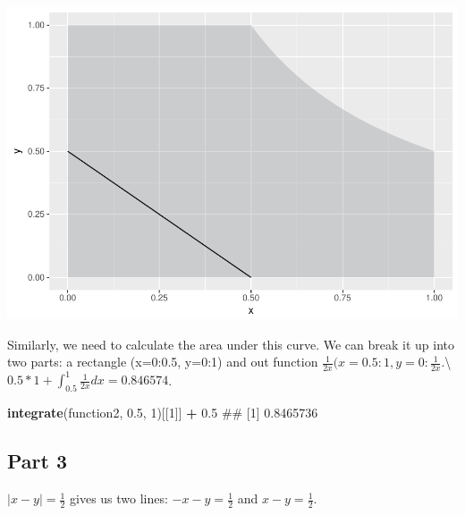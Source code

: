 \documentclass[]{article}
\newenvironment{Shaded}{\begin{snugshade}}{\end{snugshade}}
\newcommand{\KeywordTok}[1]{\textcolor[rgb]{0.13,0.29,0.53}{\textbf{#1}}}
\newcommand{\DecValTok}[1]{\textcolor[rgb]{0.00,0.00,0.81}{#1}}
\newcommand{\FloatTok}[1]{\textcolor[rgb]{0.00,0.00,0.81}{#1}}
\newcommand{\StringTok}[1]{\textcolor[rgb]{0.31,0.60,0.02}{#1}}
\newcommand{\OperatorTok}[1]{\textcolor[rgb]{0.81,0.36,0.00}{\textbf{#1}}}
\newcommand{\NormalTok}[1]{#1}
\begin{document}
\includegraphics{JSturm_Assignment5_files/figure-latex/unnamed-chunk-3-1.pdf}

Similarly, we need to calculate the area under this curve. We can break
it up into two parts: a rectangle (x=0:0.5, y=0:1) and out function
\(\frac{1}{2x} (x=0.5:1, y=0:\frac{1}{2x}\).\textbackslash{}
\(0.5 * 1 + \int_{0.5}^{1} \frac{1}{2x}dx = 0.846574\).

\begin{Shaded}
\begin{Highlighting}[]
\KeywordTok{integrate}\NormalTok{(function2, }\FloatTok{0.5}\NormalTok{, }\DecValTok{1}\NormalTok{)[[}\DecValTok{1}\NormalTok{]] }\OperatorTok{+}\StringTok{ }\FloatTok{0.5}
\NormalTok{## [1] 0.8465736}
\end{Highlighting}
\end{Shaded}

\subsection{Part 3}\label{part-3-1}

\(|x-y| = \frac{1}{2}\) gives us two lines: \(-x-y = \frac{1}{2}\) and
\(x-y = \frac{1}{2}\).
\end{document}
